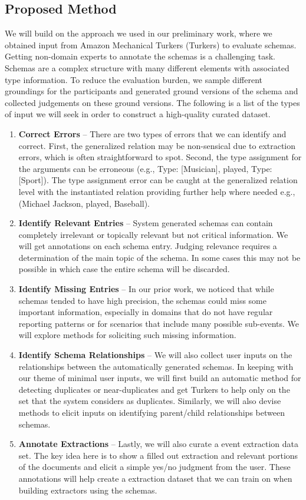 \subsection{Proposed Method}
We will build on the approach we used in our preliminary work, where we obtained input from Amazon Mechanical Turkers (Turkers) to evaluate schemas. Getting non-domain experts to annotate the schemas is a challenging task. Schemas are a complex structure with many different elements with associated type information. To reduce the evaluation burden, we sample different groundings for the participants and generated ground versions of the schema and collected judgements on these ground versions. The following is a list of the types of input we will seek in order to construct a high-quality curated dataset.
\begin{enumerate}
\item {\bf Correct Errors} -- There are two types of errors that we can identify and correct. First, the generalized relation may be non-sensical due to extraction errors, which is often straightforward to spot. Second, the type assignment for the arguments can be erroneous (e.g., Type: [Musician], played, Type: [Sport]). The type assignment error can be caught at the generalized relation level with the instantiated relation providing further help where needed e.g., (Michael Jackson, played, Baseball).
\item {\bf Identify Relevant Entries} -- System generated schemas can contain completely irrelevant or topically relevant but not critical information. We will get annotations on each schema entry. Judging relevance requires a determination of the main topic of the schema. In some cases this may not be possible in which case the entire schema will be discarded.
\item {\bf Identify Missing Entries} -- In our prior work, we noticed that while schemas tended to have high precision, the schemas could miss some important information, especially in domains that do not have regular reporting patterns or for scenarios that include many possible sub-events. We will explore methods for soliciting such missing information.
\item {\bf Identify Schema Relationships} -- We will also collect user inputs on the relationships between the automatically generated schemas. In keeping with our theme of minimal user inputs, we will first build an automatic method for detecting duplicates or near-duplicates and get Turkers to help only on the set that the system considers as duplicates. Similarly, we will also devise methods to elicit inputs on identifying parent/child relationships between schemas.   
\item {\bf Annotate Extractions} -- Lastly, we will also curate a event extraction data set. The key idea here is to show a filled out extraction and relevant portions of the documents and elicit a simple yes/no judgment from the user. These annotations will help create a extraction dataset that we can train on when building extractors using the schemas.
\end{enumerate}

